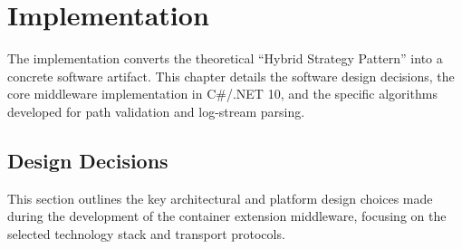 % 
% 
% 

\chapter{Implementation}
\label{ch:implementation}

The implementation converts the theoretical ``Hybrid Strategy Pattern'' into a concrete software artifact. This chapter details the software design decisions, the core middleware implementation in C\#/.NET 10, and the specific algorithms developed for path validation and log-stream parsing.

\section{Design Decisions}
This section outlines the key architectural and platform design choices made during the development of the container extension middleware, focusing on the selected technology stack and transport protocols.

